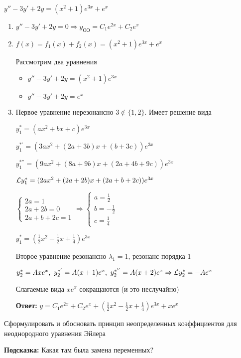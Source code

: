 \documentclass[12pt]{article}
\begin{document}
\begin{Example}{}
    $y'' - 3y' + 2y = (x^2 + 1)e^{3x} + e^x$

    \begin{enumerate}
        \item $y'' - 3y' + 2y = 0 \Rightarrow y_\text{ОО} = C_1e^{2x} + C_2e^{x}$
        
        \item $f(x) = f_1(x) + f_2(x) = (x^2 + 1)e^{3x} + e^x$

        Рассмотрим два уравнения 

        \begin{itemize}
            \item $y'' - 3y' + 2y = (x^2 + 1)e^{3x}$
            \item $y'' - 3y' + 2y = e^x$
        \end{itemize}

        \item Первое уравнение нерезонансно $3 \notin \{1, 2\}$. Имеет решение вида 
        
        $y_1^* = (ax^2 + bx + c)e^{3x}$
        
        $y_1^{*'} = (3ax^2 + (2a + 3b)x + (b + 3c))e^{3x}$

        $y_1^{*''} = (9ax^2 + (8a + 9b)x + (2a + 4b + 9c))e^{3x}$

        $\mathcal{L} y_1^* = (2ax^2 + (2a + 2b)x + (2a + b + 2c))e^{3x}$

        $\begin{cases}
            2a = 1 \\
            2a + 2b = 0 \\
            2a + b + 2c = 1
        \end{cases} \Rightarrow \begin{cases}
            a = \frac{1}{2} \\
            b = -\frac{1}{2} \\
            c = \frac{1}{4}
        \end{cases}$

        $y_1^* = \left(\frac{1}{2}x^2 - \frac{1}{2}x + \frac{1}{4}\right)e^{3x}$

        Второе уравнение резонансно $\lambda_1 = 1$, резонанс порядка 1

        $y_2^* = Axe^x,\ y_2^{*'} = A(x + 1)e^x,\ y_2^{*''} = A(x + 2)e^x \Rightarrow \L y_2^* = -Ae^x$

        Слагаемые вида $xe^x$ сокращаются (и это неслучайно)

        \textbf{Ответ:} $y = C_1e^{2x} + C_2e^x + \left( \frac{1}{2}x^2 - \frac{1}{2}x + \frac{1}{4} \right)e^{3x} + xe^x$
    \end{enumerate}
\end{Example}

\begin{Exercise}{}
    Сформулировать и обосновать принцип неопределенных коэффициентов для неоднородного уравнения Эйлера 

    \textbf{Подсказка:} Какая там была замена переменных?
\end{Exercise}
\end{document}
